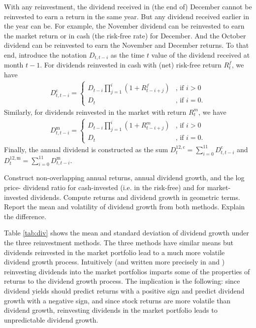 With any reinvestment, the dividend received in (the end of) December cannot be reinvested to earn a return in the same year. But any dividend received earlier in the year can be. For example, the November dividend can be reinvested to earn the market return or in cash (the risk-free rate) for December. And the October dividend can be reinvested to earn the November and December returns. To that end, introduce the notation  $D_{t,t-i}$ as the time $t$ value of the dividend received at month $t-1$. For dividends reinvested in cash with (net) risk-free return $R^f_t$, we have
\begin{align}
D_{t,t-i}^{\text{c}}=\begin{cases}
D_{t-i}\prod_{j=1}^{i}(1+R^f_{t-i+j}) & \text{, if }i>0\\
D_{t} & \text{, if }i=0.
\end{cases}
\end{align}
Similarly, for dividends reinvested in the market with return $R^m_t$, we have
\begin{align}
D_{t,t-i}^{\text{m}}=\begin{cases}
D_{t-i}\prod_{j=1}^{i}(1+R^m_{t-i+j}) & \text{, if }i>0\\
D_{t} & \text{, if }i=0.
\end{cases}
\end{align}
Finally, the annual dividend is constructed as the sum $D^{12,\text{c}}_t = \sum_{i=0}^{11} D^{\text{c}}_{t,t-i}$ and $D^{12,\text{m}}_t = \sum_{i=0}^{11} D^{\text{m}}_{t,t-i}$.


\begin{answer}[Part d ]
Construct non-overlapping annual returns, annual dividend growth, and the log price- dividend ratio for cash-invested (i.e. in the risk-free) and for market-invested dividends. Compute returns and dividend growth in geometric terms. Report the mean and volatility of dividend growth from both methods. Explain the difference.
\end{answer}

Table \ref{tab:div} shows the mean and standard deviation of dividend growth under the three reinvestment methods. The three methods have similar means but dividends reinvested in the market portfolio lead to a much more volatile dividend growth process. Intuitively (and written more precisely in \cite{koijen2011} and \cite{chen2009jfe}) reinvesting dividends into the market portfolios imparts some of the properties of returns to the dividend growth process. The implication is the following: since dividend yields should predict returns with a positive sign and predict dividend growth with a negative sign, and since stock returns are more volatile than dividend growth, reinvesting dividends in the market portfolio leads to unpredictable dividend growth.

